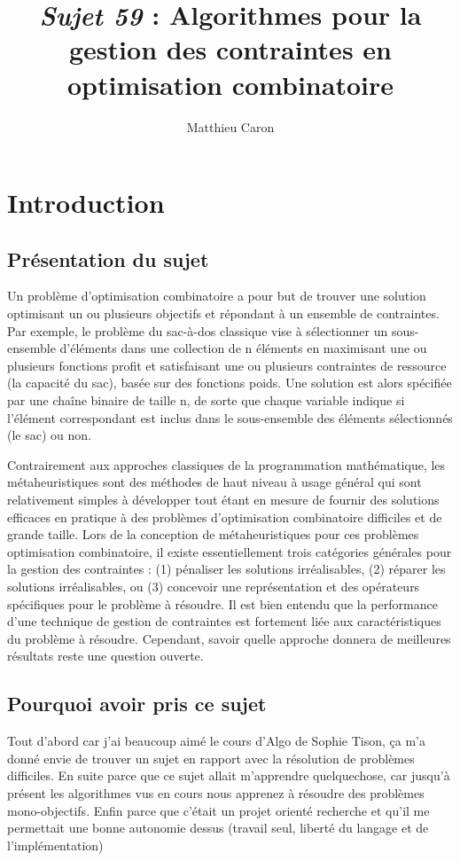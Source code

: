 \documentclass[a4paper,10pt]{report}
\title{\emph{Sujet 59} :  Algorithmes pour la gestion des contraintes en optimisation combinatoire}
\author{Matthieu Caron}
\begin{document}
\maketitle
\chapter{Introduction}
  \section{Présentation du sujet}
    Un problème d'optimisation combinatoire a pour but de trouver une solution optimisant 
    un ou plusieurs objectifs et répondant à un ensemble de contraintes. 
    Par exemple, le problème du sac-à-dos classique vise à sélectionner un sous-ensemble d'éléments 
    dans une collection de n éléments en maximisant une ou plusieurs fonctions profit et 
    satisfaisant une ou plusieurs contraintes de ressource (la capacité du sac), basée sur des fonctions poids. 
    Une solution est alors spécifiée par une chaîne binaire de taille n, de sorte que chaque variable indique 
    si l'élément correspondant est inclus dans le sous-ensemble des éléments sélectionnés (le sac) ou non.\newline
    
    Contrairement aux approches classiques de la programmation mathématique, 
    les métaheuristiques sont des méthodes de haut niveau à usage général qui sont relativement simples à développer 
    tout étant en mesure de fournir des solutions efficaces en pratique à des problèmes d'optimisation combinatoire 
    difficiles et de grande taille. 
    Lors de la conception de métaheuristiques pour ces problèmes optimisation combinatoire, 
    il existe essentiellement trois catégories générales pour la gestion des contraintes : 
    (1) pénaliser les solutions irréalisables, 
    (2) réparer les solutions irréalisables, ou 
    (3) concevoir une représentation et des opérateurs spécifiques pour le problème à résoudre. 
    Il est bien entendu que la performance d'une technique de gestion de contraintes est fortement liée 
    aux caractéristiques du problème à résoudre. Cependant, savoir quelle approche donnera de meilleures résultats 
    reste une question ouverte.
    
  \section{Pourquoi avoir pris ce sujet}
    Tout d'abord car j'ai beaucoup aimé le cours d'Algo de Sophie Tison, ça m'a donné envie de trouver un sujet en rapport
    avec la résolution de problèmes difficiles. En suite parce que ce sujet allait m'apprendre quelquechose, car jusqu'à 
    présent les algorithmes vus en cours nous apprenez à résoudre des problèmes mono-objectifs. Enfin parce que c'était 
    un projet orienté recherche et qu'il me permettait une bonne autonomie dessus (travail seul, liberté du langage et
    de l'implémentation)
\end{document}
